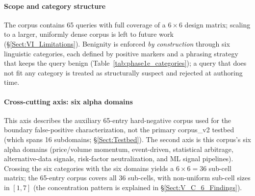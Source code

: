 \documentclass[journal]{IEEEtran}
\begin{document}
\paragraph{Scope and category structure}
The corpus contains 65 queries with full coverage of a $6 \times 6$ design matrix; scaling to a larger, uniformly dense corpus is left to future work (\S\ref{Sect:VI_Limitations}). Benignity is enforced \emph{by construction} through six linguistic categories, each defined by positive markers and a phrasing strategy that keeps the query benign (Table~\ref{tab:phase1e_categories}); a query that does not fit any category is treated as structurally suspect and rejected at authoring time.

\begin{table}[!t]
    \centering
    \caption{Six linguistic categories defining benign hard-negative construction. Each category has positive markers (vocabulary signals) and an associated linguistic strategy that maintains benign-by-construction discipline.}
    \label{tab:phase1e_categories}
\end{table}

\paragraph{Cross-cutting axis: six alpha domains}
This axis describes the auxiliary 65-entry hard-negative corpus used for the boundary false-positive characterization, not the primary corpus\_v2 testbed (which spans 16 subdomains; \S\ref{Sect:Testbed}). The second axis is this corpus's six alpha domains (price/volume momentum, event-driven, statistical arbitrage, alternative-data signals, risk-factor neutralization, and ML signal pipelines). Crossing the six categories with the six domains yields a $6 \times 6 = 36$ sub-cell matrix; the 65-entry corpus covers all 36 sub-cells, with non-uniform sub-cell sizes in $[1, 7]$ (the concentration pattern is explained in \S\ref{Sect:V_C_6_Findings}).
\end{document}
